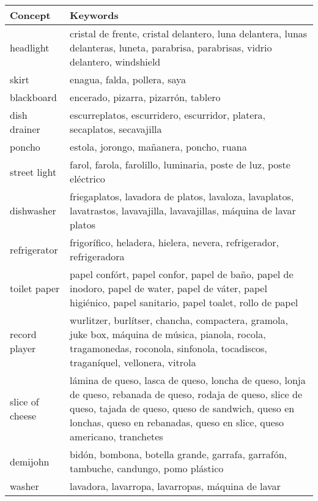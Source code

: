 \documentclass[11pt]{article}
\begin{document}
\begin{table}[t]
\begin{center}
\begin{tabularx}{\linewidth}{l X}
\hline \bf Concept & \bf Keywords \\ \hline
headlight & cristal de frente, cristal delantero, luna delantera, lunas delanteras, luneta, parabrisa, parabrisas, vidrio delantero, windshield \\
skirt & enagua, falda, pollera, saya \\
blackboard & encerado, pizarra, pizarrón, tablero \\
dish drainer & escurreplatos, escurridero, escurridor, platera, secaplatos, secavajilla \\
poncho & estola, jorongo, mañanera, poncho, ruana \\
street light & farol, farola, farolillo, luminaria, poste de luz, poste eléctrico \\
dishwasher & friegaplatos, lavadora de platos, lavaloza, lavaplatos, lavatrastos, lavavajilla, lavavajillas, máquina de lavar platos \\
refrigerator & frigorífico, heladera, hielera, nevera, refrigerador, refrigeradora \\
toilet paper & papel confórt, papel confor, papel de baño, papel de inodoro, papel de water, papel de váter, papel higiénico, papel sanitario, papel toalet, rollo de papel \\
record player & wurlitzer, burlítser, chancha, compactera, gramola, juke box, máquina de música, pianola, rocola, tragamonedas, roconola, sinfonola, tocadiscos, traganíquel, vellonera, vitrola \\
slice of cheese  & lámina de queso, lasca de queso, loncha de queso, lonja de queso, rebanada de queso, rodaja de queso, slice de queso, tajada de queso, queso de sandwich, queso en lonchas, queso en rebanadas, queso en slice, queso americano, tranchetes  \\
demijohn & bid\'on, bombona, botella grande, garrafa, garraf\'on, tambuche, candungo, pomo pl\'astico \\
washer & lavadora, lavarropa, lavarropas, máquina de lavar \\
\hline
\end{tabularx}
\end{center}
\end{table}
\end{document}
